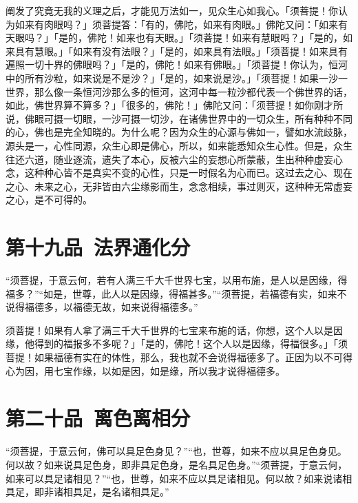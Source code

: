 \documentclass[12pt,twoside,openany]{book}
\newcommand{\kai}[1]{{\CJKfamily{kai}#1}}
\begin{document}
\kai{阐发了究竟无我的义理之后，才能见万法如一，见众生心如我心。「须菩提！你认为如来有肉眼吗？」须菩提答：「有的，佛陀，如来有肉眼。」佛陀又问：「如来有天眼吗？」「是的，佛陀！如来也有天眼。」「须菩提！如来有慧眼吗？」「是的，如来具有慧眼。」「如来有没有法眼？」「是的，如来具有法眼。」「须菩提！如来具有遍照一切十界的佛眼吗？」「是的，佛陀！如来有佛眼。」「须菩提！你认为，恒河中的所有沙粒，如来说是不是沙？」「是的，如来说是沙。」「须菩提！如果一沙一世界，那么像一条恒河沙那么多的恒河，这河中每一粒沙都代表一个佛世界的话，如此，佛世界算不算多？」「很多的，佛陀！」佛陀又问：「须菩提！如你刚才所说，佛眼可摄一切眼，一沙可摄一切沙，在诸佛世界中的一切众生，所有种种不同的心，佛也是完全知晓的。为什么呢？因为众生的心源与佛如一，譬如水流歧脉，源头是一，心性同源，众生心即是佛心，所以，如来能悉知众生心性。但是，众生往还六道，随业逐流，遗失了本心，反被六尘的妄想心所蒙蔽，生出种种虚妄心念，这种种心皆不是真实不变的心性，只是一时假名为心而已。这过去之心、现在之心、未来之心，无非皆由六尘缘影而生，念念相续，事过则灭，这种种无常虚妄之心，是不可得的。}

\chapter{第十九品\ 法界通化分}
\begin{pinyinscope}
“须菩提，于意云何，若有人满三千大千世界七宝，以用布施，是人以是因缘，得福多？”“如是，世尊，此人以是因缘，得福甚多。”“须菩提，若福德有实，如来不说得福德多，以福德无故，如来说得福德多。”
\end{pinyinscope}

\kai{须菩提！如果有人拿了满三千大千世界的七宝来布施的话，你想，这个人以是因缘，他得到的福报多不多呢？」「是的，佛陀！这个人以是因缘，得福很多。」「须菩提！如果福德有实在的体性，那么，我也就不会说得福德多了。正因为以不可得心为因，用七宝作缘，以如是因，如是缘，所以我才说得福德多。}

\chapter{第二十品\ 离色离相分}
\begin{pinyinscope}
“须菩提，于意云何，佛可以具足色身见？”“也，世尊，如来不应以具足色身见。何以故？如来说具足色身，即非具足色身，是名具足色身。”“须菩提，于意云何，如来可以具足诸相见？”“也，世尊，如来不应以具足诸相见。何以故？如来说诸相具足，即非诸相具足，是名诸相具足。”
\end{pinyinscope}
\end{document}
